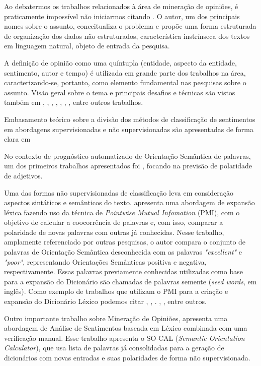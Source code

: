 \documentclass[12pt]{article}
\begin{document}
Ao debatermos os trabalhos relacionados à área de mineração de opiniões, é praticamente impossível não iniciarmos citando \cite{liu2010multifaceted}. O autor, um dos principais nomes sobre o assunto, conceitualiza o problema e propõe uma forma estruturada de organização dos dados não estruturados, característica instrínseca dos textos em linguagem natural, objeto de entrada da pesquisa. 

A definição de opinião como uma quíntupla (entidade, aspecto da entidade, sentimento, autor e tempo) é utilizada em grande parte dos trabalhos na área, caracterizando-se, portanto, como elemento fundamental nas pesquisas sobre o assunto. Visão geral sobre o tema e principais desafios e técnicas são vistos também em \cite{mohammad2016challenges}, \cite{ghaleb2016survey}, \cite{kdir16}, \cite{taboada2011lexicon}, \cite{bandhakavi2016lexicon}, \cite{Alessia}, \cite{kaji}, entre outros trabalhos.

Embasamento teórico sobre a divisão dos métodos de classificação de sentimentos em abordagens supervisionadas e não supervisionadas são apresentadas de forma clara em \cite{araujo2013metodos}

No contexto de prognóstico automatizado de Orientação Semântica de palavras, um dos primeiros trabalhos apresentados foi \cite{Hatzivassiloglou}, focando na previsão de polaridade de adjetivos.

Uma das formas não supervisionadas de classificação leva em consideração aspectos sintáticos e semânticos do texto. \cite{Turney2002} apresenta uma abordagem de expansão léxica fazendo uso da técnica de \emph{Pointwise Mutual Infomation} (PMI), com o objetivo de calcular a coocorrência de palavras e, com isso, comparar a polaridade de novas palavras com outras já conhecidas. Nesse trabalho, amplamente referenciado por outras pesquisas, o autor compara o conjunto de palavras de Orientação Semântica desconhecida com as palavras \emph{ "excellent"} e \emph{"poor"}, representando Orientações Semânticas positiva e negativa, respectivamente. Essas palavras previamente conhecidas utilizadas como base para a expansão do Dicionário são chamadas de palavras semente (\emph{seed words}, em inglês). Como exemplo de trabalhos que utilizam o PMI para a criação e expansão do Dicionário Léxico podemos citar \cite{becker2013}, \cite{Zhou2014}, \cite{Pinto2007}. \cite{Pantel2006}, \cite{duwairi2015detecting}, entre outros.

Outro importante trabalho sobre Mineração de Opiniões, \cite{taboada2011lexicon} apresenta uma abordagem de Análise de Sentimentos baseada em Léxico combinada com uma verificação manual. Esse trabalho apresenta o SO-CAL (\emph{Semantic Orientation Calculator}), que usa lista de palavras já consolidadas para a geração de dicionários com novas entradas e suas polaridades de forma não supervisionada.
\end{document}
